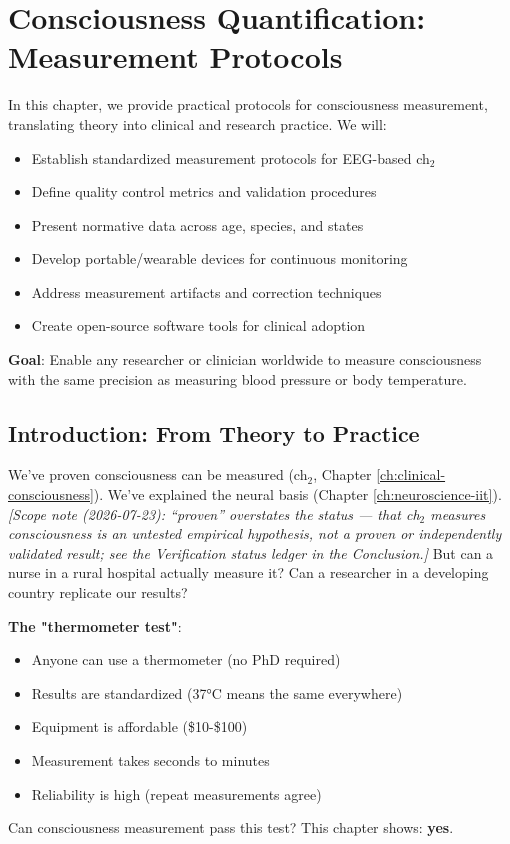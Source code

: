 \chapter{Consciousness Quantification: Measurement Protocols}
\label{ch:consciousness-quantification}

\begin{chapterobjectives}
In this chapter, we provide practical protocols for consciousness measurement, translating theory into clinical and research practice. We will:
\begin{itemize}
\item Establish standardized measurement protocols for EEG-based ch$_2$
\item Define quality control metrics and validation procedures
\item Present normative data across age, species, and states
\item Develop portable/wearable devices for continuous monitoring
\item Address measurement artifacts and correction techniques
\item Create open-source software tools for clinical adoption
\end{itemize}

\textbf{Goal}: Enable any researcher or clinician worldwide to measure consciousness with the same precision as measuring blood pressure or body temperature.
\end{chapterobjectives}

\section{Introduction: From Theory to Practice}

\begin{intuitive}
We've proven consciousness can be measured (ch$_2$, Chapter \ref{ch:clinical-consciousness}). We've explained the neural basis (Chapter \ref{ch:neuroscience-iit}).
\emph{[Scope note (2026-07-23): ``proven'' overstates the status --- that ch$_2$ measures consciousness is an untested empirical hypothesis, not a proven or independently validated result; see the Verification status ledger in the Conclusion.]} But can a nurse in a rural hospital actually measure it? Can a researcher in a developing country replicate our results?

\textbf{The "thermometer test"}:
\begin{itemize}
\item Anyone can use a thermometer (no PhD required)
\item Results are standardized (37°C means the same everywhere)
\item Equipment is affordable (\$10-\$100)
\item Measurement takes seconds to minutes
\item Reliability is high (repeat measurements agree)
\end{itemize}

Can consciousness measurement pass this test? This chapter shows: \textbf{yes}.
\end{intuitive}

